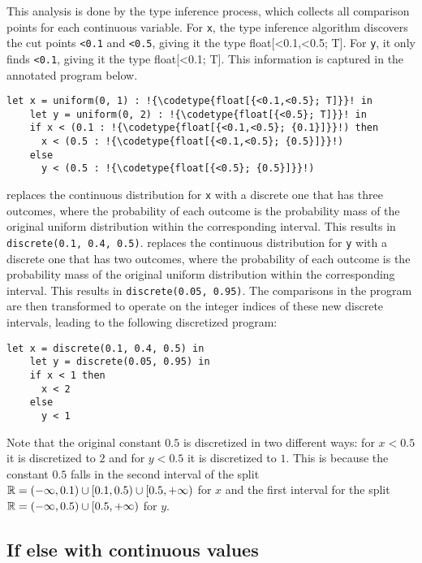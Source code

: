 \documentclass[acmsmall,screen,dvipsnames,x11names,nonacm,anonymous,review]{acmart}
\newcommand{\codetype}[1]{\textcolor{typecolor}{\ttfamily\small#1}}
\begin{document}
This analysis is done by the type inference process, which collects all comparison points for each continuous variable. For \texttt{x}, the type inference algorithm discovers the cut points \texttt{<0.1} and \texttt{<0.5}, giving it the type \codetype{float[<0.1,<0.5; T]}. For \texttt{y}, it only finds \texttt{<0.1}, giving it the type \codetype{float[<0.1; T]}. This information is captured in the annotated program below.

\begin{lstlisting}[aboveskip=1em,belowskip=1em,escapechar=!]
    let x = uniform(0, 1) : !{\codetype{float[{<0.1,<0.5}; T]}}! in
    let y = uniform(0, 2) : !{\codetype{float[{<0.5}; T]}}! in
    if x < (0.1 : !{\codetype{float[{<0.1,<0.5}; {0.1}]}}!) then
      x < (0.5 : !{\codetype{float[{<0.1,<0.5}; {0.5}]}}!)
    else
      y < (0.5 : !{\codetype{float[{<0.5}; {0.5}]}}!)
\end{lstlisting}


\Slice{} replaces the continuous distribution for \texttt{x} with a discrete one that has three outcomes, where the probability of each outcome is the probability mass of the original uniform distribution within the corresponding interval. This results in \texttt{discrete(0.1, 0.4, 0.5)}.
\Slice{} replaces the continuous distribution for \texttt{y} with a discrete one that has two outcomes, where the probability of each outcome is the probability mass of the original uniform distribution within the corresponding interval. This results in \texttt{discrete(0.05, 0.95)}. The comparisons in the program are then transformed to operate on the integer indices of these new discrete intervals, leading to the following discretized program:

\begin{lstlisting}[aboveskip=1em,belowskip=1em]
    let x = discrete(0.1, 0.4, 0.5) in
    let y = discrete(0.05, 0.95) in
    if x < 1 then
      x < 2
    else
      y < 1
\end{lstlisting}

Note that the original constant $0.5$ is discretized in two different ways: for $x < 0.5$ it is discretized to $2$ and for $y < 0.5$ it is discretized to $1$. This is because the constant $0.5$ falls in the second interval of the split $\mathbb{R} = (-\infty, 0.1) \cup [0.1, 0.5) \cup [0.5, +\infty)$ for $x$ and the first interval for the split $\mathbb{R} = (-\infty, 0.5) \cup [0.5, +\infty)$ for $y$.

\subsection{If else with continuous values}
\end{document}
